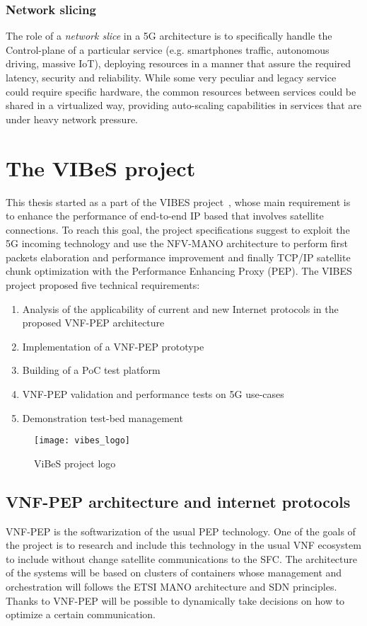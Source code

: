 \subsubsection{Network slicing}
\label{chap:background:sec:5g:sub:ns}
The role of a \emph{network slice} in a 5G architecture is to specifically
handle the Control-plane of a particular service (e.g. smartphones traffic,
autonomous driving, massive IoT), deploying resources in a manner that assure
the required latency, security and reliability. While some very peculiar and
legacy service could require specific hardware, the common resources between
services could be shared in a virtualized way, providing auto-scaling
capabilities in services that are under heavy network pressure.

\section{The VIBeS project}
This thesis started as a part of the VIBES project~\cite{vibesesa}, whose main
requirement is to enhance the performance of end-to-end IP based that involves
satellite connections. To reach this goal, the project specifications suggest to
exploit the 5G incoming technology and use the NFV-MANO architecture to perform
first packets elaboration and performance improvement and finally TCP/IP
satellite chunk optimization with the Performance Enhancing Proxy (PEP). The
VIBES project proposed five technical requirements:
\begin{enumerate}
  \item Analysis of the applicability of current and new Internet protocols in
  the proposed VNF-PEP architecture
  \item Implementation of a VNF-PEP prototype
  \item Building of a PoC test platform
  \item VNF-PEP validation and performance tests on 5G use-cases
  \item Demonstration test-bed management
\end{enumerate}

\begin{figure}[t]
 \centering
 \texttt{[image: vibes\_logo]}
 \caption{ViBeS project logo}
 \label{chap:background:img:vibes_logo}
\end{figure}

\subsection{VNF-PEP architecture and internet protocols}
VNF-PEP is the softwarization of the usual PEP technology. One of the goals of
the project is to research and include this technology in the usual VNF
ecosystem to include without change satellite communications to the SFC. The
architecture of the systems will be based on clusters of containers whose
management and orchestration will follows the ETSI MANO architecture and SDN
principles. Thanks to VNF-PEP will be possible to dynamically take decisions on
how to optimize a certain communication.

